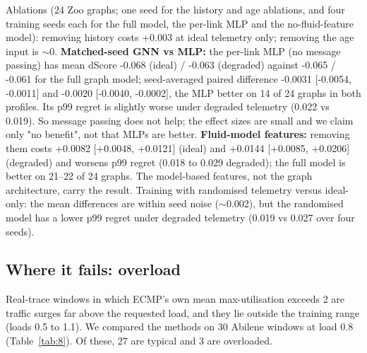 \documentclass[journal]{IEEEtran}
\begin{document}
Ablations (24 Zoo graphs; one seed for the history and age ablations, and four training seeds each for the full model, the per-link MLP and the no-fluid-feature model): removing history costs +0.003 at ideal telemetry only; removing the age input is $\sim$0. \textbf{Matched-seed GNN vs MLP:} the per-link MLP (no message passing) has mean dScore -0.068 (ideal) / -0.063 (degraded) against -0.065 / -0.061 for the full graph model; seed-averaged paired difference -0.0031 [-0.0054, -0.0011] and -0.0020 [-0.0040, -0.0002], the MLP better on 14 of 24 graphs in both profiles. Its p99 regret is slightly worse under degraded telemetry (0.022 vs 0.019). So message passing does not help; the effect sizes are small and we claim only "no benefit", not that MLPs are better. \textbf{Fluid-model features:} removing them costs +0.0082 [+0.0048, +0.0121] (ideal) and +0.0144 [+0.0085, +0.0206] (degraded) and worsens p99 regret (0.018 to 0.029 degraded); the full model is better on 21--22 of 24 graphs. The model-based features, not the graph architecture, carry the result. Training with randomised telemetry versus ideal-only: the mean differences are within seed noise ($\sim$0.002), but the randomised model has a lower p99 regret under degraded telemetry (0.019 vs 0.027 over four seeds).

\subsection{Where it fails: overload}
\label{sec:6.4}
Real-trace windows in which ECMP's own mean max-utilisation exceeds 2 are traffic surges far above the requested load, and they lie outside the training range (loads 0.5 to 1.1). We compared the methods on 30 Abilene windows at load 0.8 (Table~\ref{tab:8}). Of these, 27 are typical and 3 are overloaded.

\begin{table}[!t]
\caption{Typical and overloaded Abilene windows at load 0.8 (30 windows). Gain over ECMP in \%: median and worst window.}
\label{tab:8}
\centering
\scriptsize
\renewcommand{\arraystretch}{1.05}
\end{table}
\end{document}
